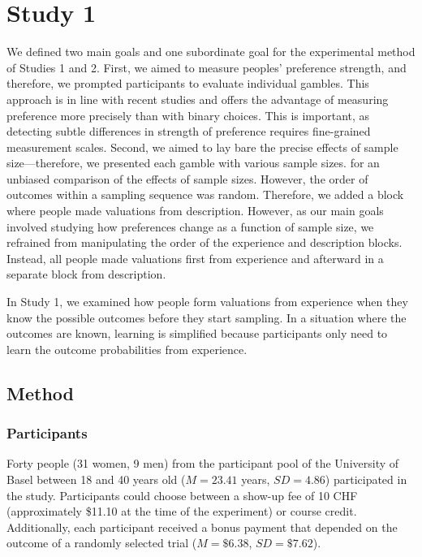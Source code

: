 \documentclass[a4paper, man, natbib, floatsintext]{apa6} %
\begin{document}
\section{Study 1}
We defined two main goals and one subordinate goal for the experimental method of Studies 1 and 2. First, we aimed to measure peoples' preference strength, and therefore, we prompted participants to evaluate individual gambles. This approach is in line with recent studies \citep[e.g.,][]{Ashby2014, Golan2014, Pachur2012} and offers the advantage of measuring preference more precisely than with binary choices. This is important, as detecting subtle differences in strength of preference requires fine-grained measurement scales. Second, we aimed to lay bare the precise effects of sample size---therefore, we presented each gamble with various sample sizes.  for an unbiased comparison of the effects of sample sizes. However, the order of outcomes within a sampling sequence was random.  Therefore, we added a block where people made valuations from description. However, as our main goals involved studying how preferences change as a function of sample size, we refrained from manipulating the order of the experience and description blocks. Instead, all people made valuations first from experience and afterward in a separate block from description. 

In Study 1, we examined how people form valuations from experience when they know the possible outcomes before they start sampling. In a situation where the outcomes are known, learning is simplified because participants only need to learn the outcome probabilities from experience. 

\subsection{Method}
\subsubsection{Participants}
Forty people (31 women, 9 men) from the participant pool of the University of Basel between 18 and 40 years old ($M = 23.41$ years, $SD = 4.86$) participated in the study. Participants could choose between a show-up fee of 10 CHF (approximately \$11.10 at the time of the experiment) or course credit. Additionally, each participant received a bonus payment that depended on the outcome of a randomly selected trial ($M = \$6.38$, $SD = \$7.62$).
\end{document}
